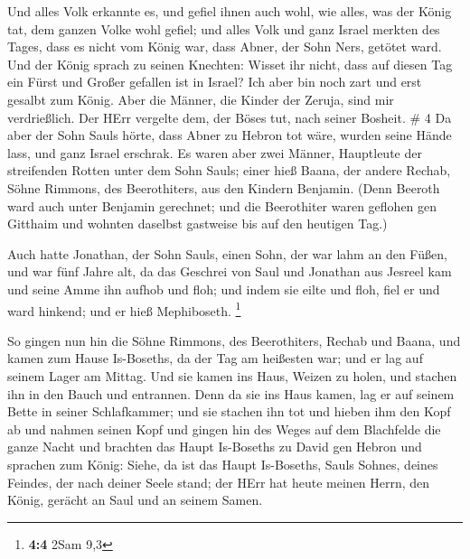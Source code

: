  Und alles Volk erkannte es, und gefiel ihnen auch wohl,
wie alles, was der König tat, dem ganzen Volke wohl gefiel;
 und alles Volk und ganz Israel merkten des Tages, dass es
nicht vom König war, dass Abner, der Sohn Ners, getötet ward.
 Und der König sprach zu seinen Knechten: Wisset ihr nicht,
dass auf diesen Tag ein Fürst und Großer gefallen ist in Israel?
 Ich aber bin noch zart und erst gesalbt zum König. Aber
die Männer, die Kinder der Zeruja, sind mir verdrießlich. Der HErr
vergelte dem, der Böses tut, nach seiner Bosheit. \# 4  Da
aber der Sohn Sauls hörte, dass Abner zu Hebron tot wäre, wurden seine
Hände lass, und ganz Israel erschrak.  Es waren aber zwei
Männer, Hauptleute der streifenden Rotten unter dem Sohn Sauls; einer
hieß Baana, der andere Rechab, Söhne Rimmons, des Beerothiters, aus den
Kindern Benjamin. (Denn Beeroth ward auch unter Benjamin gerechnet;
 und die Beerothiter waren geflohen gen Gitthaim und wohnten
daselbst gastweise bis auf den heutigen Tag.)

 Auch hatte Jonathan, der Sohn Sauls, einen Sohn, der war
lahm an den Füßen, und war fünf Jahre alt, da das Geschrei von Saul und
Jonathan aus Jesreel kam und seine Amme ihn aufhob und floh; und indem
sie eilte und floh, fiel er und ward hinkend; und er hieß Mephiboseth.
\footnote{\textbf{4:4} 2Sam 9,3}

 So gingen nun hin die Söhne Rimmons, des Beerothiters,
Rechab und Baana, und kamen zum Hause Is-Boseths, da der Tag am
heißesten war; und er lag auf seinem Lager am Mittag.  Und
sie kamen ins Haus, Weizen zu holen, und stachen ihn in den Bauch und
entrannen.  Denn da sie ins Haus kamen, lag er auf seinem
Bette in seiner Schlafkammer; und sie stachen ihn tot und hieben ihm den
Kopf ab und nahmen seinen Kopf und gingen hin des Weges auf dem
Blachfelde die ganze Nacht  und brachten das Haupt
Is-Boseths zu David gen Hebron und sprachen zum König: Siehe, da ist das
Haupt Is-Boseths, Sauls Sohnes, deines Feindes, der nach deiner Seele
stand; der HErr hat heute meinen Herrn, den König, gerächt an Saul und
an seinem Samen.

